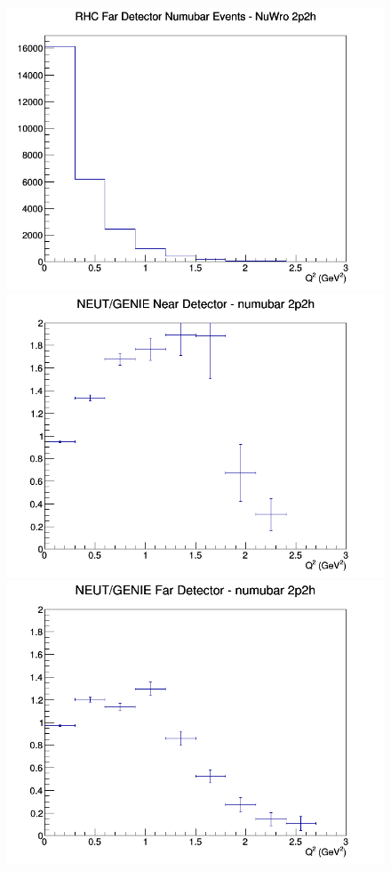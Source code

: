 \documentclass[12pt]{article}
\begin{document}
\begin{figure}[h]
\endminipage
{}
\includegraphics[width=\linewidth]{eff_Q2/FGT/2p2h_RHC_FD_numubar_Q2_NuWro.png}
\endminipage
\newline
{}
\includegraphics[width=\linewidth]{eff_Q2/FGT/ratios/2p2h_NEUT_GENIE_numubar_near_Q2.png}
\endminipage
{}
\includegraphics[width=\linewidth]{eff_Q2/FGT/ratios/2p2h_NEUT_GENIE_numubar_far_Q2.png}

\end{figure}
\end{document}
